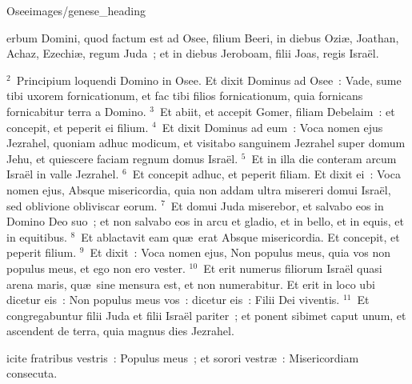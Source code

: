 {Osee}{images/genese_heading}


\bchapter
{}erbum Domini, quod factum est ad Osee, filium Beeri, in diebus Ozi\ae , Joathan, Achaz, Ezechi\ae , regum Juda~; et in diebus Jeroboam, filii Joas, regis Isra\"el.


${}^{2}$~Principium loquendi Domino in Osee. Et dixit Dominus ad Osee~: Vade, sume tibi uxorem fornicationum, et fac tibi filios fornicationum, quia fornicans fornicabitur terra a Domino.
${}^{3}$~Et abiit, et accepit Gomer, filiam Debelaim~: et concepit, et peperit ei filium.
${}^{4}$~Et dixit Dominus ad eum~: Voca nomen ejus Jezrahel, quoniam adhuc modicum, et visitabo sanguinem Jezrahel super domum Jehu, et quiescere faciam regnum domus Isra\"el.
${}^{5}$~Et in illa die conteram arcum Isra\"el in valle Jezrahel.
${}^{6}$~Et concepit adhuc, et peperit filiam. Et dixit ei~: Voca nomen ejus, Absque misericordia, quia non addam ultra misereri domui Isra\"el, sed oblivione obliviscar eorum.
${}^{7}$~Et domui Juda miserebor, et salvabo eos in Domino Deo suo~; et non salvabo eos in arcu et gladio, et in bello, et in equis, et in equitibus.
${}^{8}$~Et ablactavit eam qu\ae\ erat Absque misericordia. Et concepit, et peperit filium.
${}^{9}$~Et dixit~: Voca nomen ejus, Non populus meus, quia vos non populus meus, et ego non ero vester.
${}^{10}$~Et erit numerus filiorum Isra\"el quasi arena maris, qu\ae\ sine mensura est, et non numerabitur. Et erit in loco ubi dicetur eis~: Non populus meus vos~: dicetur eis~: Filii Dei viventis.
${}^{11}$~Et congregabuntur filii Juda et filii Isra\"el pariter~; et ponent sibimet caput unum, et ascendent de terra, quia magnus dies Jezrahel.

\bchapter
{}icite fratribus vestris~: Populus meus~; et sorori vestr\ae~: Misericordiam consecuta.


